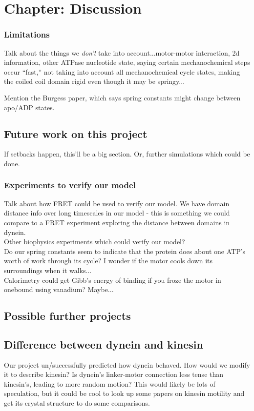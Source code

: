 \documentclass[10pt]{article} %
\begin{document}
\section{Chapter: Discussion}
\subsubsection{Limitations}
Talk about the things we \textit{don't} take into account...motor-motor interaction, 2d information,
other ATPase nucleotide state, saying certain mechanochemical steps occur ``fast,'' not taking into
account all mechanochemical cycle states, making the coiled coil domain rigid even though it may be
springy...

Mention the Burgess paper, which says spring constants might change between apo/ADP states.
\subsection{Future work on this project}
If setbacks happen, this'll be a big section. Or, further simulations which could be done.

\subsubsection{Experiments to verify our model}
Talk about how FRET could be used to verify our model. We have domain distance info over long
timescales in our model - this is something we could compare to a FRET experiment exploring
the distance between domains in dynein.\\

Other biophysics experiments which could verify our model?\\

Do our spring constants seem to indicate that the protein does about one ATP's worth of work through its cycle? I wonder if the motor cools down its surroundings when it walks...\\

Calorimetry could get Gibb's energy of binding if you froze the motor in onebound using
vanadium? Maybe...\\
\subsection{Possible further projects}
\subsection{Difference between dynein and kinesin}
Our project un/successfully predicted how dynein behaved. How would we modify it to describe kinesin?
Is dynein's linker-motor connection less tense than kinesin's, leading to more random motion? This
would likely be lots of speculation, but it could be cool to look up some papers on kinesin motility
and get its crystal structure to do some comparisons.
\end{document}
